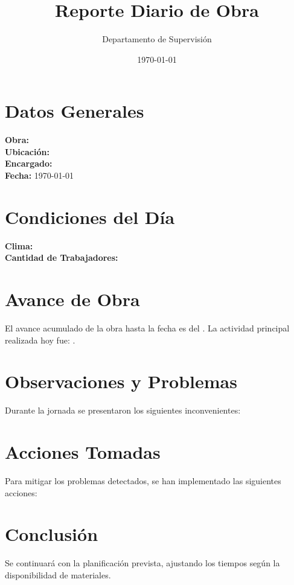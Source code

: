 \documentclass[a4paper,12pt]{article}
\title{Reporte Diario de Obra}
\author{Departamento de Supervisión}
\date{\today}
\begin{document}
	
	\maketitle
	
	\section*{Datos Generales}
	\noindent \textbf{Obra:}  \\
	\textbf{Ubicación:}  \\
	\textbf{Encargado:}  \\
	\textbf{Fecha:} \today \\
	
	\section*{Condiciones del Día}
	\noindent \textbf{Clima:}  \\
	\textbf{Cantidad de Trabajadores:} 
	
	\section*{Avance de Obra}
	El avance acumulado de la obra hasta la fecha es del .  
	La actividad principal realizada hoy fue: \textit{}.
	
	\section*{Observaciones y Problemas}
	Durante la jornada se presentaron los siguientes inconvenientes:  
	
	\section*{Acciones Tomadas}
	Para mitigar los problemas detectados, se han implementado las siguientes acciones:  
	
	\section*{Conclusión}
	Se continuará con la planificación prevista, ajustando los tiempos según la disponibilidad de materiales.
	
\end{document}
